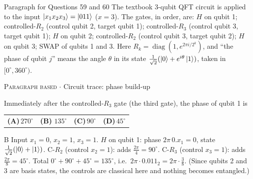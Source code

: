 \documentclass[11pt,a4paper]{article}
\newcommand{\optlabel}[1]{\textbf{(#1)}}
\newcommand{\correctlabel}[1]{\textcolor{okgreen}{\textbf{(#1)}\,\ding{51}}}
\newenvironment{qitem}[1]{\begin{list}{}{\setlength{\leftmargin}{3.3em}\setlength{\labelwidth}{3.1em}%
  \setlength{\labelsep}{0.2em}\setlength{\topsep}{3pt}\setlength{\parsep}{3pt}}\item[\textbf{Q.#1}\hfill]}{\end{list}}
\newcommand{\qsep}{\par\vspace{2pt}{\color{black!15}\hrule}\vspace{4pt}}
\newcommand{\qmeta}[2]{{\footnotesize\color{black!60}\textsc{#1} \;$\cdot$\; #2}\par}
\begin{document}
\begin{passagebox}{Paragraph for Questions 59 and 60}
The textbook 3-qubit QFT circuit is applied to the input $\ket{x_1x_2x_3} = \ket{011}$ ($x = 3$). The gates, in order, are:
$H$ on qubit 1; controlled-$R_2$ (control qubit 2, target qubit 1); controlled-$R_3$ (control qubit 3, target qubit 1);
$H$ on qubit 2; controlled-$R_2$ (control qubit 3, target qubit 2); $H$ on qubit 3; SWAP of qubits 1 and 3.
Here $R_k = \operatorname{diag}(1, e^{2\pi i/2^k})$, and ``the phase of qubit $j$'' means the angle $\theta$ in its state
$\frac{1}{\sqrt2}(\ket0 + e^{i\theta}\ket1)$, taken in $[0^\circ, 360^\circ)$.
\end{passagebox}
\begin{qitem}{59}
\qmeta{Paragraph based}{Circuit trace: phase build-up}
Immediately after the controlled-$R_3$ gate (the third gate), the phase of qubit 1 is
\par\smallskip\noindent\begin{tabularx}{\linewidth}{@{}*{4}{L}@{}}
\optlabel{A}\,$270^\circ$ & \correctlabel{B}\,$135^\circ$ & \optlabel{C}\,$90^\circ$ & \optlabel{D}\,$45^\circ$
\end{tabularx}
\end{qitem}
\begin{solbox}{B}
Input $x_1 = 0$, $x_2 = 1$, $x_3 = 1$.
$H$ on qubit 1: phase $2\pi\,0.x_1 = 0$, state $\frac{1}{\sqrt2}(\ket0 + \ket1)$.
C-$R_2$ (control $x_2 = 1$): adds $\frac{2\pi}{4} = 90^\circ$. C-$R_3$ (control $x_3 = 1$): adds $\frac{2\pi}{8} = 45^\circ$.
Total $0^\circ + 90^\circ + 45^\circ = 135^\circ$, i.e.\ $2\pi\cdot 0.011_2 = 2\pi\cdot\frac38$. (Since qubits 2 and 3 are basis states,
the controls are classical here and nothing becomes entangled.)
\end{solbox}
\qsep
\end{document}
